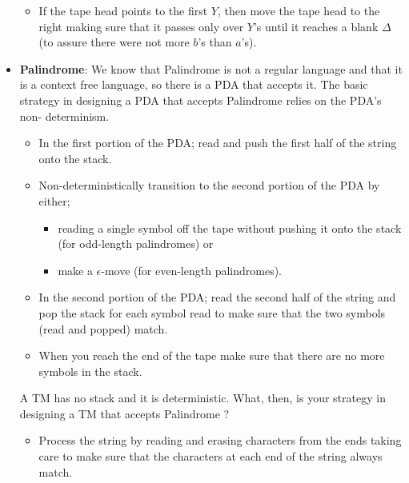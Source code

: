 \documentclass{report}
\begin{document}
\begin{itemize}
\begin{itemize}
                \item If the tape head points to the first $Y$, then move the tape head to the right making sure that it passes only over $Y$'s until it reaches a blank $\Delta$ (to assure there were not more $b$'s than $a$'s).
            \end{itemize}
            \bigbreak \noindent 
            \begin{figure}[ht]
                \centering
                \label{fig:t2}
            \end{figure}
            \pagebreak 
        \item \textbf{Palindrome}: We know that Palindrome is not a regular language and that it is a context free language, so there is a PDA that accepts it. The basic strategy in designing a PDA that accepts Palindrome relies on the PDA's non- determinism.
            \begin{itemize}
                \item In the first portion of the PDA; read and push the first half of the string onto the stack.
                \item Non-deterministically transition to the second portion of the PDA by either;
                    \begin{itemize}
                        \item reading a single symbol off the tape without pushing it onto the stack (for odd-length palindromes) or
                        \item make a $\epsilon$-move (for even-length palindromes).
                    \end{itemize}
                \item In the second portion of the PDA; read the second half of the string and pop the stack for each symbol read to make sure that the two symbols (read and popped) match.
                \item When you reach the end of the tape make sure that there are no more symbols in the stack.
            \end{itemize}
            \bigbreak \noindent 
            A TM has no stack and it is deterministic. What, then, is your strategy in designing a TM that accepts Palindrome ?
            \begin{itemize}
                \item Process the string by reading and erasing characters from the ends taking care to make sure that the characters at each end of the string always match.

\end{itemize}
\end{itemize}
\end{document}
